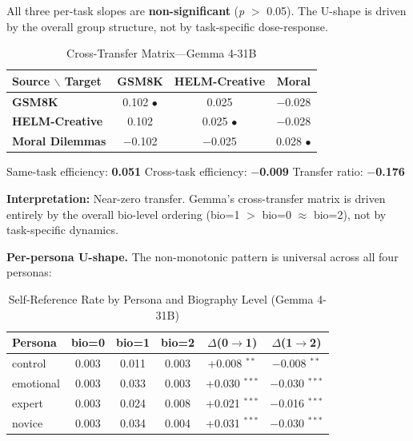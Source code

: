 \documentclass[11pt,a4paper]{article}
\begin{document}
All three per-task slopes are \textbf{non-significant} (\textit{p} $>$ 0.05). The U-shape is driven by the overall group structure, not by task-specific dose-response.

\begin{table}[H]
\centering
\caption{Cross-Transfer Matrix---Gemma 4-31B}
\label{tab:ct_gemma}
\begin{tabular}{lccc}
\toprule
\textbf{Source $\backslash$ Target} & \textbf{GSM8K} & \textbf{HELM-Creative} & \textbf{Moral} \\
\midrule
\textbf{GSM8K} & 0.102 $\bullet$ & 0.025 & $-$0.028 \\
\textbf{HELM-Creative} & 0.102 & 0.025 $\bullet$ & $-$0.028 \\
\textbf{Moral Dilemmas} & $-$0.102 & $-$0.025 & 0.028 $\bullet$ \\
\bottomrule
\end{tabular}
\end{table}

Same-task efficiency: \textbf{0.051} \quad Cross-task efficiency: \textbf{$-$0.009} \quad Transfer ratio: \textbf{$-$0.176}

\textbf{Interpretation:} Near-zero transfer. Gemma's cross-transfer matrix is driven entirely by the overall bio-level ordering (bio=1 $>$ bio=0 $\approx$ bio=2), not by task-specific dynamics.

\textbf{Per-persona U-shape.} The non-monotonic pattern is universal across all four personas:

\begin{table}[H]
\centering
\caption{Self-Reference Rate by Persona and Biography Level (Gemma 4-31B)}
\label{tab:gemma_persona}
\begin{tabular}{lccccc}
\toprule
\textbf{Persona} & \textbf{bio=0} & \textbf{bio=1} & \textbf{bio=2} & \textbf{$\Delta$(0$\rightarrow$1)} & \textbf{$\Delta$(1$\rightarrow$2)} \\
\midrule
control & 0.003 & 0.011 & 0.003 & +0.008 $^{**}$ & $-$0.008 $^{**}$ \\
emotional & 0.003 & 0.033 & 0.003 & +0.030 $^{***}$ & $-$0.030 $^{***}$ \\
expert & 0.003 & 0.024 & 0.008 & +0.021 $^{***}$ & $-$0.016 $^{***}$ \\
novice & 0.003 & 0.034 & 0.004 & +0.031 $^{***}$ & $-$0.030 $^{***}$ \\
\bottomrule
\end{tabular}
\end{table}
\end{document}

